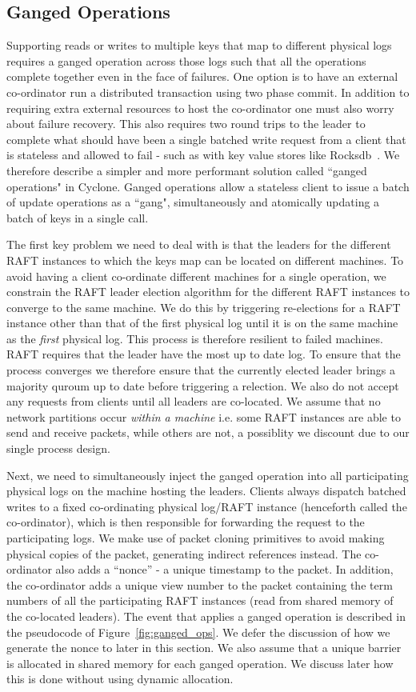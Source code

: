\documentclass[pageno]{jpaper}
\begin{document}
\subsection{Ganged Operations}
Supporting reads or writes to multiple keys that map to different physical logs
requires a ganged operation across those logs such that all the operations
complete together even in the face of failures. One option is to have an
external co-ordinator run a distributed transaction using two phase commit. In
addition to requiring extra external resources to host the co-ordinator one must
also worry about failure recovery. This also requires two round trips to the
leader to complete what should have been a single batched write request from a
client that is stateless and allowed to fail - such as with key value stores
like Rocksdb~\cite{rocksdb}. We therefore describe a simpler and more performant
solution called ``ganged operations" in Cyclone. Ganged operations allow a
stateless client to issue a batch of update operations as a ``gang",
simultaneously and atomically updating a batch of keys in a single call.

The first key problem we need to deal with is that the leaders for the different
RAFT instances to which the keys map can be located on different machines. To
avoid having a client co-ordinate different machines for a single operation, we
constrain the RAFT leader election algorithm for the different RAFT instances to
converge to the same machine. We do this by triggering re-elections for a RAFT
instance other than that of the first physical log until it is on the same
machine as the \emph{first} physical log. This process is therefore resilient to
failed machines. RAFT requires that the leader have the most up to date log. To
ensure that the process converges we therefore ensure that the currently elected
leader brings a majority quroum up to date before triggering a relection. We
also do not accept any requests from clients until all leaders are
co-located. We assume that no network partitions occur \emph{within a machine}
i.e. some RAFT instances are able to send and receive packets, while others are
not, a possiblity we discount due to our single process design.

Next, we need to simultaneously inject the ganged operation into all
participating physical logs on the machine hosting the leaders. Clients always
dispatch batched writes to a fixed co-ordinating physical log/RAFT instance
(henceforth called the co-ordinator), which is then responsible for forwarding
the request to the participating logs. We make use of packet cloning primitives
to avoid making physical copies of the packet, generating indirect references
instead. The co-ordinator also adds a ``nonce'' - a unique timestamp to the
packet. In addition, the co-ordinator adds a unique view number to the packet
containing the term numbers of all the participating RAFT instances (read from
shared memory of the co-located leaders).  The event that applies a ganged
operation is described in the pseudocode of Figure~\ref{fig:ganged_ops}. We
defer the discussion of how we generate the nonce to later in this section. We
also assume that a unique barrier is allocated in shared memory for each ganged
operation. We discuss later how this is done without using dynamic allocation.
\end{document}
